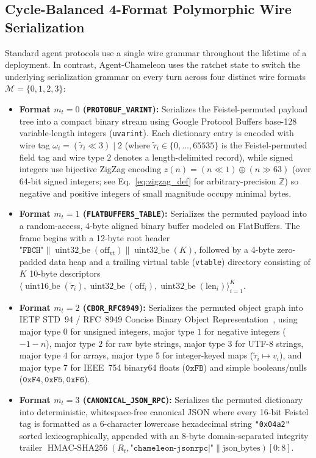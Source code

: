 \documentclass[conference,10pt]{IEEEtran}
\begin{document}
\subsection{Cycle-Balanced 4-Format Polymorphic Wire Serialization}
Standard agent protocols use a single wire grammar throughout the lifetime of a deployment. In contrast, Agent-Chameleon uses the ratchet state to switch the underlying serialization grammar on every turn across four distinct wire formats $\mathcal{M} = \{0, 1, 2, 3\}$:

\begin{itemize}
    \item \textbf{Format $m_t = 0$ (\texttt{PROTOBUF\_VARINT}):} Serializes the Feistel-permuted payload tree into a compact binary stream using Google Protocol Buffers base-128 variable-length integers (\texttt{uvarint}). Each dictionary entry is encoded with wire tag $\omega_i = (\tilde{\tau}_i \ll 3) \mid 2$ (where $\tilde{\tau}_i \in \{0,\dots,65535\}$ is the Feistel-permuted field tag and wire type $2$ denotes a length-delimited record), while signed integers use bijective ZigZag encoding $z(n) = (n \ll 1) \oplus (n \gg 63)$ (over 64-bit signed integers; see Eq.~\eqref{eq:zigzag_def} for arbitrary-precision $\mathbb{Z}$) so negative and positive integers of small magnitude occupy minimal bytes.
    \item \textbf{Format $m_t = 1$ (\texttt{FLATBUFFERS\_TABLE}):} Serializes the permuted payload into a random-access, 4-byte aligned binary buffer modeled on FlatBuffers. The frame begins with a 12-byte root header $\texttt{"FBCH"} \parallel \operatorname{uint32\_be}(\text{off}_{\text{vt}}) \parallel \operatorname{uint32\_be}(K)$, followed by a 4-byte zero-padded data heap and a trailing virtual table (\texttt{vtable}) directory consisting of $K$ 10-byte descriptors $\langle \operatorname{uint16\_be}(\tilde{\tau}_i), \operatorname{uint32\_be}(\text{off}_i), \operatorname{uint32\_be}(\text{len}_i) \rangle_{i=1}^K$.
    \item \textbf{Format $m_t = 2$ (\texttt{CBOR\_RFC8949}):} Serializes the permuted object graph into IETF STD~94 / RFC~8949 Concise Binary Object Representation~\cite{bormann2020cbor}, using major type $0$ for unsigned integers, major type $1$ for negative integers ($-1 - n$), major type $2$ for raw byte strings, major type $3$ for UTF-8 strings, major type $4$ for arrays, major type $5$ for integer-keyed maps ($\tilde{\tau}_i \mapsto v_i$), and major type $7$ for IEEE~754 binary64 floats ($\mathtt{0xFB}$) and simple booleans/nulls ($\mathtt{0xF4}, \mathtt{0xF5}, \mathtt{0xF6}$).
    \item \textbf{Format $m_t = 3$ (\texttt{CANONICAL\_JSON\_RPC}):} Serializes the permuted dictionary into deterministic, whitespace-free canonical JSON where every 16-bit Feistel tag is formatted as a 6-character lowercase hexadecimal string \texttt{"0x04a2"} sorted lexicographically, appended with an 8-byte domain-separated integrity trailer $\operatorname{HMAC-SHA256}(R_t, \texttt{"chameleon-jsonrpc|"} \parallel \text{json\_bytes})[0:8]$.
\end{itemize}
\end{document}
